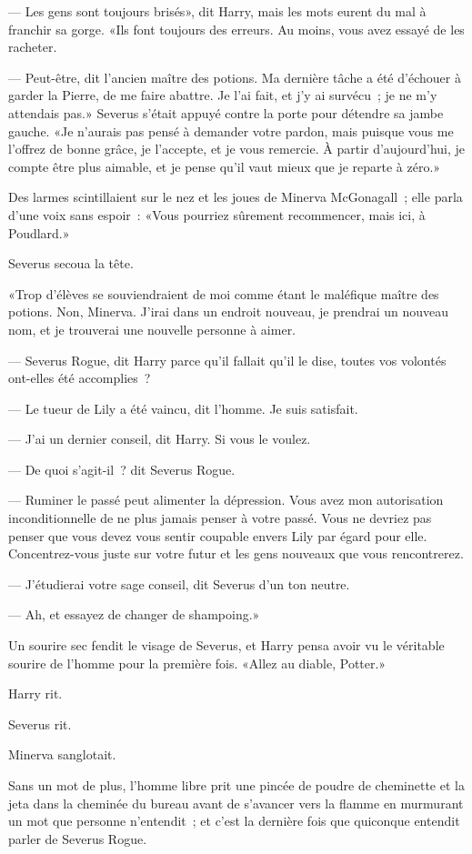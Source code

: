 --- Les gens sont toujours brisés», dit Harry, mais les mots eurent du mal à franchir sa gorge. «Ils font toujours des erreurs. Au moins, vous avez essayé de les racheter.

--- Peut-être, dit l'ancien maître des potions. Ma dernière tâche a été d'échouer à garder la Pierre, de me faire abattre. Je l'ai fait, et j'y ai survécu~; je ne m'y attendais pas.» Severus s'était appuyé contre la porte pour détendre sa jambe gauche. «Je n'aurais pas pensé à demander votre pardon, mais puisque vous me l'offrez de bonne grâce, je l'accepte, et je vous remercie. À partir d'aujourd'hui, je compte être plus aimable, et je pense qu'il vaut mieux que je reparte à zéro.»

Des larmes scintillaient sur le nez et les joues de Minerva McGonagall~; elle parla d'une voix sans espoir~: «Vous pourriez sûrement recommencer, mais ici, à Poudlard.»

Severus secoua la tête.

«Trop d'élèves se souviendraient de moi comme étant le maléfique maître des potions. Non, Minerva. J'irai dans un endroit nouveau, je prendrai un nouveau nom, et je trouverai une nouvelle personne à aimer.

--- Severus Rogue, dit Harry parce qu'il fallait qu'il le dise, toutes vos volontés ont-elles été accomplies~?

--- Le tueur de Lily a été vaincu, dit l'homme. Je suis satisfait.

--- J'ai un dernier conseil, dit Harry. Si vous le voulez.

--- De quoi s'agit-il~? dit Severus Rogue.

--- Ruminer le passé peut alimenter la dépression. Vous avez mon autorisation inconditionnelle de ne plus jamais penser à votre passé. Vous ne devriez pas penser que vous devez vous sentir coupable envers Lily par égard pour elle. Concentrez-vous juste sur votre futur et les gens nouveaux que vous rencontrerez.

--- J'étudierai votre sage conseil, dit Severus d'un ton neutre.

--- Ah, et essayez de changer de shampoing.»

Un sourire sec fendit le visage de Severus, et Harry pensa avoir vu le véritable sourire de l'homme pour la première fois. «Allez au diable, Potter.»

Harry rit.

Severus rit.

Minerva sanglotait.

Sans un mot de plus, l'homme libre prit une pincée de poudre de cheminette et la jeta dans la cheminée du bureau avant de s'avancer vers la flamme en murmurant un mot que personne n'entendit~; et c'est la dernière fois que quiconque entendit parler de Severus Rogue.
